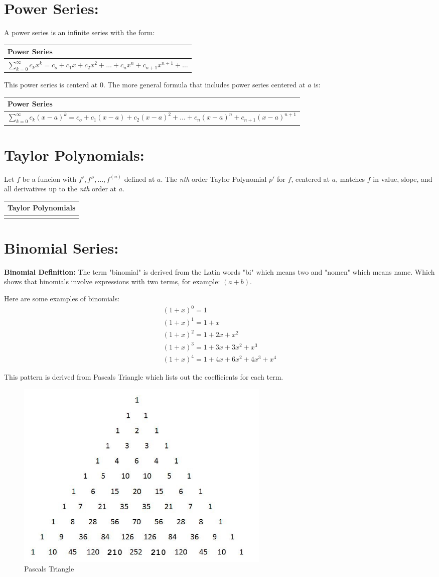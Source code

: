 \documentclass[12pt]{article}
\newcommand{\formula}[2]{
    {\renewcommand{\arraystretch}{2}
        \begin{center}
        \begin{tabular}{|p{0.9\textwidth}|}
        \hline
        \textbf{#1} \\
        \hline
        #2 \\
        \hline
        \end{tabular}
        \end{center}
    }
}
\begin{document}
\section{Power Series: }
A power series is an infinite series with the form:
\formula{Power Series}{$\sum_{k=0}^{\infty} c_k x^k = c_o + c_1 x + c_2 x^2 + \dotsc + c_n x^n + c_{n+1} x^{n+1} + \dotsc$}

This power series is centerd at $0$. The more general formula that includes power series centered at $a$ is:
\formula{Power Series}{$\sum_{k=0}^{\infty} c_k (x-a)^k = c_o + c_1 (x-a) + c_2 (x-a)^2 + \dotsc + c_n (x-a)^n + c_{n+1} (x-a)^{n+1}$}

\section{Taylor Polynomials: }
Let $f$ be a funcion with $f', f'', \dotsc, f^{(n)} $ defined at $a$. The \textit{nth} order Taylor Polynomial $p'$ for $f$, centered at $a$, matches $f$ in value, slope, and all derivatives up to the \textit{nth} order at $a$.
\formula{Taylor Polynomials}{}

\section{Binomial Series: }
\textbf{Binomial Definition:}
The term "binomial" is derived from the Latin words "bi" which means two and "nomen" which means name. Which shows that binomials involve expressions with two terms, for example: $(a+b)$.

Here are some examples of binomials:
\begin{gather*}
(1+x)^0 = 1 \\
(1+x)^1 = 1+x \\
(1+x)^2 = 1 + 2x + x^2 \\
(1+x)^3 = 1 + 3x + 3x^2 + x^3 \\
(1+x)^4 = 1 + 4x + 6x^2 + 4x^3 + x^4
\end{gather*}

This pattern is derived from Pascals Triangle which lists out the coefficients for each term.

\begin{figure}[h]
\centering
\includegraphics[width=0.6\textwidth]{img/pascals_triangle}
\caption{Pascals Triangle}
\end{figure}
\end{document}
